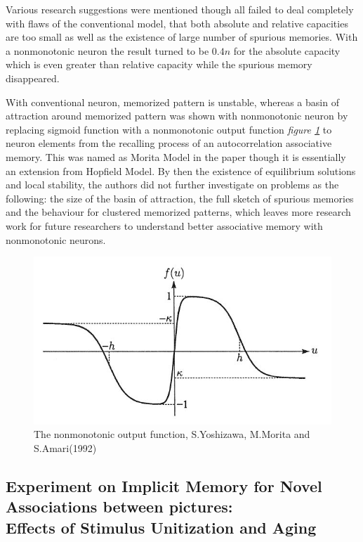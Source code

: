 \documentclass[12pt, a4paper]{article}
\begin{document}
Various research suggestions were mentioned though all failed to deal completely with flaws of the conventional model, that both absolute and relative capacities are too small as well as the existence of large number of spurious memories. With a nonmonotonic neuron the result turned to be $0.4n$ for the absolute capacity which is even greater than relative capacity while the spurious memory disappeared.

With conventional neuron, memorized pattern is unstable, whereas a basin of attraction around memorized pattern was shown with nonmonotonic neuron by replacing sigmoid function with a nonmonotonic output function \textit{figure \ref{fig:nonmonotonic}} to neuron elements from the recalling process of an autocorrelation associative memory. This was named as Morita Model in the paper though it is essentially an extension from Hopfield Model.
By then the existence of equilibrium solutions and local stability, the authors did not further investigate on problems as the following: the size of the basin of attraction, the full sketch of spurious memories and the behaviour for clustered memorized patterns, which leaves more research work for future researchers to understand better associative memory with nonmonotonic neurons.

\begin{figure}[htbp]
	\centering
	\includegraphics[scale = 0.8]{inc/nonmonotonic.jpg}
	\caption{The nonmonotonic output function, S.Yoshizawa, M.Morita and S.Amari(1992)}
	\label{fig:nonmonotonic}
\end{figure}

\subsection{Experiment on Implicit Memory for Novel Associations between pictures: \\ Effects of Stimulus Unitization and Aging\cite{stimulus_unitization_and_aging}}
\end{document}
